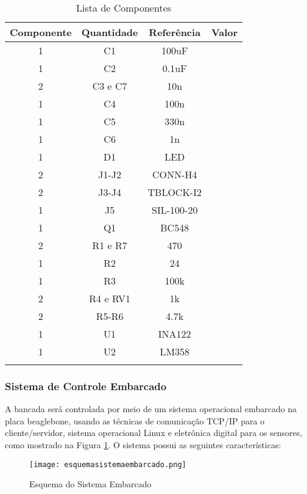 	\begin{table}[!h]
	\centering
	\caption{Lista de Componentes}
	\vspace{0.5cm}
	\begin{tabular}{c  c  c  c}
	\hline
	\textbf{Componente} & \textbf{Quantidade} & \textbf{Referência}	& \textbf{Valor}\\
	\hline
	1 &	C1	& 100uF\\
	\hline
	1 &	C2 &	0.1uF\\
	\hline
	2 & C3 e C7 & 10n\\
	\hline
	1 &	C4 &	100n\\
	\hline
	1 &	C5 &	330n\\
	\hline
	1 &	C6 &	1n\\
	\hline
	1 &	D1 &	LED\\
	\hline
	2 &	J1-J2 &	CONN-H4\\
	\hline
	2 &	J3-J4 &	TBLOCK-I2\\
	\hline
	1 &	J5 &	SIL-100-20\\
	\hline
	1 &	Q1 &	BC548\\
	\hline
	2 & R1 e R7 & 470\\
	\hline
	1 &	R2 &	24\\
	\hline
	1 &	R3 &	100k\\
	\hline
	2 & R4 e RV1 & 1k\\
	\hline
	2 &	R5-R6 &	4.7k\\
	\hline
	1 &	U1 &	INA122\\
	\hline
	1 &	U2 &	LM358\\
	\hline

	\label{materiais}
	\end{tabular}
	\end{table}


\subsubsection{Sistema de Controle Embarcado}

	A bancada será controlada por meio de um sistema operacional embarcado na placa beaglebone, usando as técnicas de comunicação TCP/IP para o cliente/servidor, sistema operacional Linux e eletrônica digital para os sensores, como mostrado na Figura \ref{esquema}. O sistema possui as seguintes características:

	\begin{figure}[!h]
		\centering
		\texttt{[image: esquemasistemaembarcado.png]}
		\caption{Esquema do Sistema Embarcado}
		\label{esquema}
	\end{figure}

